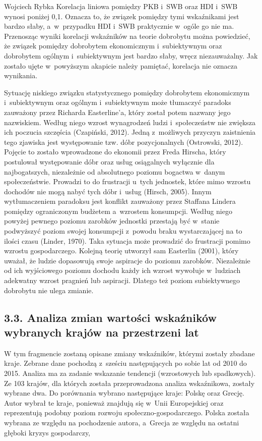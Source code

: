 \begin{artplenv}{Wojciech Rybka}
Korelacja liniowa pomiędzy PKB i~SWB oraz HDI i~SWB wynosi poniżej 0,1. Oznacza to, że związek pomiędzy tymi wskaźnikami
jest bardzo słaby, a~w~przypadku HDI i~SWB praktycznie w~ogóle go nie ma. Przenosząc wyniki korelacji wskaźników na
teorie dobrobytu można powiedzieć, że związek pomiędzy dobrobytem ekonomicznym i~subiektywnym oraz dobrobytem
ogólnym i~subiektywnym jest bardzo słaby, wręcz niezauważalny. Jak zostało ujęte w~powyższym akapicie należy pamiętać,
korelacja nie oznacza wynikania. 

Sytuację niskiego związku statystycznego pomiędzy dobrobytem ekonomicznym  i~subiektywnym oraz ogólnym i~subiektywnym
może tłumaczyć paradoks zauważony przez Richarda Easterline’a, który został potem nazwany jego nazwiskiem. Według niego
wzrost wynagrodzeń ludzi i~społeczeństw nie zwiększa ich poczucia szczęścia
\label{ref:RNDfoy0hnuZJ7}(Czapiński, 2012).
Jedną z~możliwych przyczyn zaistnienia tego zjawiska jest występowanie tzw. dóbr pozycjonalnych
\label{ref:RNDG3fUII3Pao}(Ostrowski, 2012). Pojęcie to zostało wprowadzone do ekonomii przez Freda Hirscha, który
postulował występowanie dóbr oraz usług osiągalnych wyłącznie dla najbogatszych, niezależnie od absolutnego poziomu
bogactwa w~danym społeczeństwie. Prowadzi to do frustracji u~tych jednostek, które mimo wzrostu dochodów nie mogą nabyć
tych dóbr i~usług \label{ref:RNDZj3QxDgrTA}(Hirsch, 2005). Innym wytłumaczeniem paradoksu jest konflikt zauważony przez
Staffana Lindera pomiędzy ograniczonym budżetem a~wzrostem konsumpcji. Według niego powyżej pewnego poziomu zarobków
jednostki przestają być w~stanie podwyższyć poziom swojej konsumpcji z~powodu braku wystarczającej na to ilości czasu
\label{ref:RNDpvorRQMoaH}(Linder, 1970). Taka sytuacja może prowadzić do frustracji pomimo wzrostu gospodarczego.
Kolejną teorię utworzył sam Easterlin \label{ref:RNDYv1mj8RNHJ}(2001), który uważał, że ludzie dopasowują swoje
aspiracje do poziomu zarobków. Niezależnie od ich wyjściowego poziomu dochodu każdy ich wzrost wywołuje w~ludziach
adekwatny wzrost pragnień lub aspiracji. Dlatego też poziom subiektywnego dobrobytu nie ulega zmianie.

\subsection{3.3. Analiza zmian wartości wskaźników wybranych krajów na przestrzeni lat}
W tym fragmencie zostaną opisane zmiany wskaźników, którymi zostały zbadane kraje. Zebrane dane pochodzą z~sześciu
następujących po sobie lat od 2010 do 2015. Analiza ma za zadanie wskazanie tendencji (wzrostowych lub spadkowych). Ze
103 krajów, dla których została przeprowadzona analiza wskaźnikowa, zostały wybrane dwa. Do porównania wybrano
następujące kraje: Polskę oraz Grecję. Autor wybrał te kraje, ponieważ znajdują się w~Unii Europejskiej oraz
reprezentują podobny poziom rozwoju społeczno-gospodarczego. Polska została wybrana ze względu na pochodzenie autora,
a~Grecja ze względu na ostatni głęboki kryzys gospodarczy, 


\end{artplenv}

